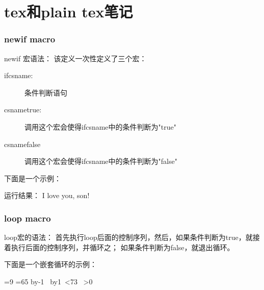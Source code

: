 ﻿\documentclass{article}
\begin{document}
  \tt %

  \pagestyle{header}
  \sybmaketitle
  \tableofcontents
  \newpage

  \pagestyle{main}
  \setcounter{page}{1}

  \part[tex和plain tex笔记]{tex和plain tex笔记}
  \section[newif macro]{\bs newif macro}
  \bs newif 宏语法：
  该定义一次性定义了三个宏：
  \begin{description}
    \item[\bs if\lt csname\gt:] 条件判断语句
    \item[\bs\lt csname\gt true:] 调用这个宏会使得\bs if\lt csname\gt 中的条件判断为"true"
    \item[\bs\lt csname\gt false] 调用这个宏会使得\bs if\lt csname\gt 中的条件判断为"false"
  \end{description}
  下面是一个示例：

  \begin{latexcode}
\newif\ifboy
\newif\ifgirl
\ifboytrue
\ifboy{I love you, son!}\fi
\ifgirl{I love you, daughter!}\fi
  \end{latexcode}

  运行结果：
  \newif\ifboy
  \newif\ifgirl
  \boytrue
  \ifboy{I love you, son!}\fi
  \ifgirl{I love you, daughter!}\fi

  \section[loop macro]{loop macro}
  \bs loop宏的语法：
  首先执行\bs loop后面的控制序列，然后，如果条件判断为true，就接着执行后面的控制序列，并循环之；
  如果条件判断为false，就退出循环。

  下面是一个嵌套循环的示例：

  \begin{latexcode}
\vbox{
  =9
  \loop
    =65 %
    \advance{} by-1
    \hbox{%
      \loop
      \char{} \the{}
      \advance{} by1
      \ifnum{}<73
      \space
      \repeat
    }
  \ifnum{}>0
  \repeat
}
  \end{latexcode}
\end{document}
